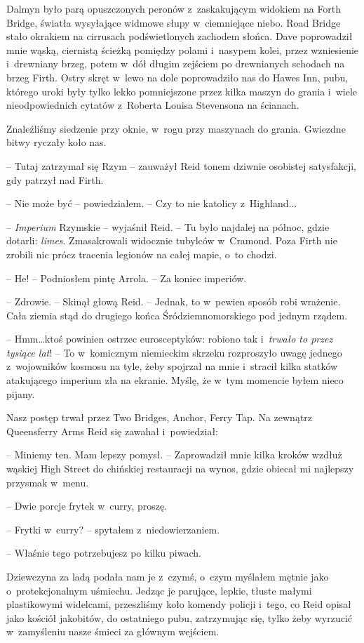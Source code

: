 \documentclass[oneside,polish,11pt,sfheadings]{mwbk}
\begin{document}
Dalmyn było parą opuszczonych peronów z~zaskakującym widokiem na Forth
Bridge, światła wysyłające widmowe słupy w~ciemniejące niebo. Road
Bridge stało okrakiem na cirrusach podświetlonych zachodem słońca. Dave
poprowadził mnie wąską, ciernistą ścieżką pomiędzy polami i~nasypem
kolei, przez wzniesienie i~drewniany brzeg, potem w~dół długim zejściem
po drewnianych schodach na brzeg Firth. Ostry skręt w~lewo na dole
poprowadziło nas do Hawes Inn, pubu, którego uroki były tylko lekko
pomniejszone przez kilka maszyn do grania i~wiele nieodpowiednich
cytatów z~Roberta Louisa Stevensona na ścianach.

Znaleźliśmy siedzenie przy oknie, w~rogu przy maszynach do grania.
Gwiezdne bitwy ryczały koło nas.

-- Tutaj zatrzymał się Rzym -- zauważył Reid tonem dziwnie osobistej
satysfakcji, gdy patrzył nad Firth.

-- Nie może być -- powiedziałem. -- Czy to nie katolicy z~Highland...

-- \emph{Imperium} Rzymskie -- wyjaśnił Reid. -- Tu było najdalej na
północ, gdzie dotarli: \emph{limes}. Zmasakrowali widocznie tubylców w~Cramond. Poza Firth nie zrobili nic prócz tracenia legionów na całej
mapie, o~to chodzi.

-- He! -- Podniosłem pintę Arrola. -- Za koniec imperiów.

-- Zdrowie. -- Skinął głową Reid. -- Jednak, to w~pewien sposób robi
wrażenie. Cała ziemia stąd do drugiego końca Śródziemnomorskiego pod
jednym rządem.

-- Hmm\ldots ktoś powinien ostrzec eurosceptyków: robiono tak i~\emph{trwało
to przez tysiące lat}! -- To w~komicznym niemieckim skrzeku rozproszyło
uwagę jednego z~wojowników kosmosu na tyle, żeby spojrzał na mnie i~stracił kilka statków atakującego imperium zła na ekranie. Myślę, że w~tym momencie byłem nieco pijany.

Nasz postęp trwał przez Two Bridges, Anchor, Ferry Tap. Na zewnątrz
Queensferry Arms Reid się zawahał i~powiedział: 

-- Miniemy ten. Mam lepszy pomysł. -- Zaprowadził mnie kilka kroków wzdłuż wąskiej High
Street do chińskiej restauracji na wynos, gdzie obiecał mi najlepszy
przysmak w~menu.

-- Dwie porcje frytek w~curry, proszę.

-- Frytki w~curry? -- spytałem z~niedowierzaniem.

-- Właśnie tego potrzebujesz po kilku piwach.

Dziewczyna za ladą podała nam je z~czymś, o~czym myślałem mętnie jako o~protekcjonalnym uśmiechu. Jedząc je parujące, lepkie, tłuste małymi
plastikowymi widelcami, przeszliśmy koło komendy policji i~tego, co Reid
opisał jako kościół jakobitów, do ostatniego pubu, zatrzymując się,
tylko żeby wyrzucić w~zamyśleniu nasze śmieci za głównym wejściem.
\end{document}
